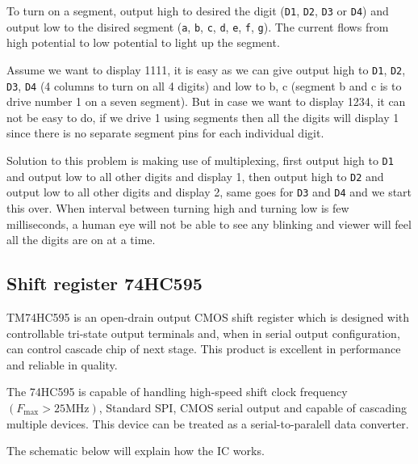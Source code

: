 \documentclass[a4paper,twoside]{report}
\begin{document}

To turn on a segment, output high to desired the digit (\texttt{D1}, \texttt{D2}, \texttt{D3} or \texttt{D4}) and output low to the disired segment (\texttt{a}, \texttt{b}, \texttt{c}, \texttt{d}, \texttt{e}, \texttt{f}, \texttt{g}). The current flows from high potential to low potential to light up the segment.

Assume we want to display 1111, it is easy as we can give output high to \texttt{D1}, \texttt{D2}, \texttt{D3}, \texttt{D4} (4 columns to turn on all 4  digits) and low to b, c (segment b and c is to drive number 1 on a seven segment). But in case we want to display 1234, it can not be easy to do, if we drive 1 using segments then all the digits will display 1 since there is no separate segment pins for each individual digit.

Solution to this problem is making use of multiplexing, first output high to \texttt{D1} and output low to all other digits and display 1, then output high to \texttt{D2} and output low to all other digits and display 2, same goes for \texttt{D3} and \texttt{D4} and we start this over. When interval between turning high and turning low is few milliseconds, a human eye will not be able to see any blinking and viewer will feel all the digits are on at a time.

\subsection{Shift register 74HC595}
TM74HC595 is an open-drain output CMOS shift register which is designed with controllable tri-state output terminals and, when in serial output configuration, can control cascade chip of next stage. This product is excellent in performance and reliable in quality.

The 74HC595 is capable of handling high-speed shift clock frequency $(F_{\text{max}} > 25 \text{MHz})$, Standard SPI, CMOS serial output and capable of cascading multiple devices. This device can be treated as a serial-to-paralell data converter.

The schematic below will explain how the IC works.
\end{document}
